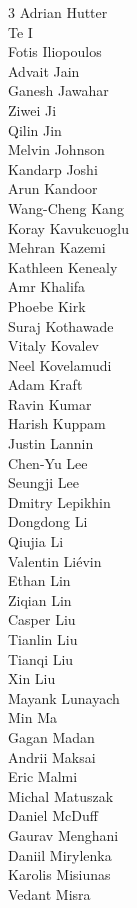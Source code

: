 \begin{multicols}{3}
Adrian Hutter \\ 
Te I \\ 
Fotis Iliopoulos \\ 
Advait Jain \\ 
Ganesh Jawahar \\ 
Ziwei Ji \\ 
Qilin Jin \\ 
Melvin Johnson \\ 
Kandarp Joshi \\ 
Arun Kandoor \\ 
Wang-Cheng Kang \\ 
Koray Kavukcuoglu \\ 
Mehran Kazemi \\ 
Kathleen Kenealy \\ 
Amr Khalifa \\ 
Phoebe Kirk \\ 
Suraj Kothawade \\ 
Vitaly Kovalev \\ 
Neel Kovelamudi \\ 
Adam Kraft \\ 
Ravin Kumar \\ 
Harish Kuppam \\ 
Justin Lannin \\ 
Chen-Yu Lee \\ 
Seungji Lee \\ 
Dmitry Lepikhin \\ 
Dongdong Li \\ 
Qiujia Li \\ 
Valentin Liévin \\ 
Ethan Lin \\ 
Ziqian Lin \\ 
Casper Liu \\ 
Tianlin Liu \\ 
Tianqi Liu \\ 
Xin Liu \\ 
Mayank Lunayach \\ 
Min Ma \\ 
Gagan Madan \\ 
Andrii Maksai \\ 
Eric Malmi \\ 
Michal Matuszak \\ 
Daniel McDuff \\ 
Gaurav Menghani \\ 
Daniil Mirylenka \\ 
Karolis Misiunas \\ 
Vedant Misra \\ 

\end{multicols}
